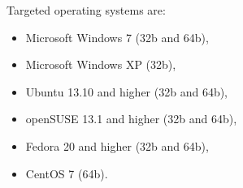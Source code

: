     Targeted operating systems are:
    \begin{itemize}
        \item Microsoft Windows 7 (32b and 64b),
        \item Microsoft Windows XP (32b),
        \item Ubuntu 13.10 and higher (32b and 64b),
        \item openSUSE 13.1 and higher (32b and 64b),
        \item Fedora 20 and higher (32b and 64b),
        \item CentOS 7 (64b).
    \end{itemize}
